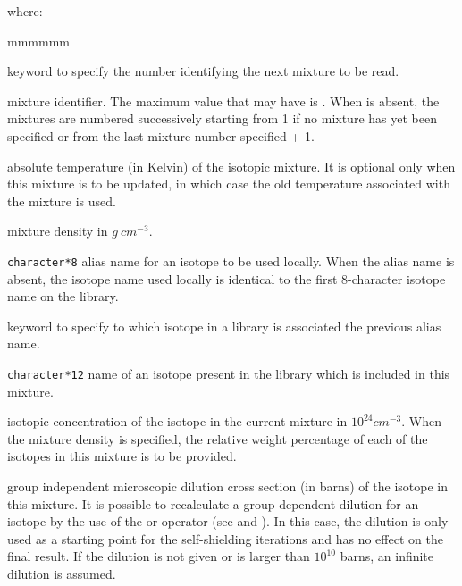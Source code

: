 \vspace{-0.15cm}

\noindent
where:

\begin{ListeDeDescription}{mmmmmm}

\item[\moc{MIX}] keyword to specify the number identifying the next mixture to
be read.

\item[\dusa{matnum}] mixture identifier. The maximum value that 
may have is . When  is absent, the mixtures are
numbered successively starting from 1 if no mixture has yet been specified or
from the last mixture number specified + 1.

\item[\dusa{temp}] absolute temperature (in Kelvin) of the isotopic mixture.
It is optional only when this mixture is to be updated, in which case the old
temperature associated with the mixture is used.

\item[\dusa{denmix}] mixture density in $g \ cm^{-3}$. 

\item[\dusa{NAMALI}] {\tt character*8} alias name for an isotope to be used
locally. When the alias name is absent, the isotope name used locally is
identical to the first 8-character isotope name on the library.

\item[\moc{=}] keyword to specify to which isotope in a library is associated
the previous alias name.

\item[\dusa{NAMISO}] {\tt character*12} name of an isotope present in the
library which is included in this mixture.

\item[\dusa{dens}]  isotopic concentration of the isotope  in the
current mixture in $10^{24}cm^{-3}$.  When the mixture density  
is specified, the relative weight percentage of each of the isotopes in this
mixture is to be provided.

\item[\dusa{dil}] group independent microscopic dilution cross section (in
barns) of the isotope  in this mixture. It is possible to
recalculate a group dependent dilution for an isotope by the use of the
 or  operator (see  and ). In this case, the dilution is only used
as a starting point for the self-shielding iterations and has no effect on the
final result. If the dilution is not given or is larger than $10^{10}$ barns,
an infinite dilution is assumed.


\end{ListeDeDescription}
